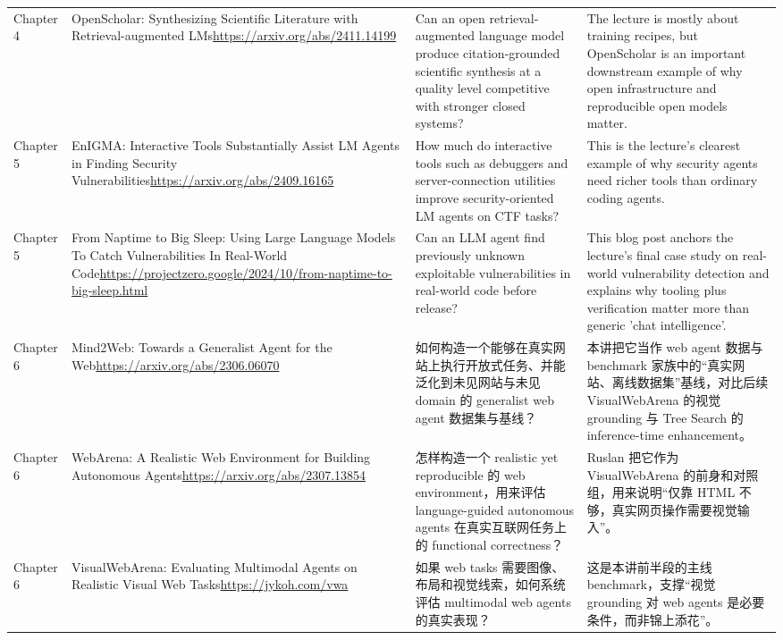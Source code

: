 \begin{longtable}{p{}p{}p{}p{}}
Chapter 4 & OpenScholar: Synthesizing Scientific Literature with Retrieval-augmented LMs\newline\url{https://arxiv.org/abs/2411.14199} & Can an open retrieval-augmented language model produce citation-grounded scientific synthesis at a quality level competitive with stronger closed systems? & The lecture is mostly about training recipes, but OpenScholar is an important downstream example of why open infrastructure and reproducible open models matter. \\
Chapter 5 & EnIGMA: Interactive Tools Substantially Assist LM Agents in Finding Security Vulnerabilities\newline\url{https://arxiv.org/abs/2409.16165} & How much do interactive tools such as debuggers and server-connection utilities improve security-oriented LM agents on CTF tasks? & This is the lecture's clearest example of why security agents need richer tools than ordinary coding agents. \\
Chapter 5 & From Naptime to Big Sleep: Using Large Language Models To Catch Vulnerabilities In Real-World Code\newline\url{https://projectzero.google/2024/10/from-naptime-to-big-sleep.html} & Can an LLM agent find previously unknown exploitable vulnerabilities in real-world code before release? & This blog post anchors the lecture's final case study on real-world vulnerability detection and explains why tooling plus verification matter more than generic 'chat intelligence'. \\
Chapter 6 & Mind2Web: Towards a Generalist Agent for the Web\newline\url{https://arxiv.org/abs/2306.06070} & 如何构造一个能够在真实网站上执行开放式任务、并能泛化到未见网站与未见 domain 的 generalist web agent 数据集与基线？ & 本讲把它当作 web agent 数据与 benchmark 家族中的“真实网站、离线数据集”基线，对比后续 VisualWebArena 的视觉 grounding 与 Tree Search 的 inference-time enhancement。 \\
Chapter 6 & WebArena: A Realistic Web Environment for Building Autonomous Agents\newline\url{https://arxiv.org/abs/2307.13854} & 怎样构造一个 realistic yet reproducible 的 web environment，用来评估 language-guided autonomous agents 在真实互联网任务上的 functional correctness？ & Ruslan 把它作为 VisualWebArena 的前身和对照组，用来说明“仅靠 HTML 不够，真实网页操作需要视觉输入”。 \\
Chapter 6 & VisualWebArena: Evaluating Multimodal Agents on Realistic Visual Web Tasks\newline\url{https://jykoh.com/vwa} & 如果 web tasks 需要图像、布局和视觉线索，如何系统评估 multimodal web agents 的真实表现？ & 这是本讲前半段的主线 benchmark，支撑“视觉 grounding 对 web agents 是必要条件，而非锦上添花”。 \\

\end{longtable}
